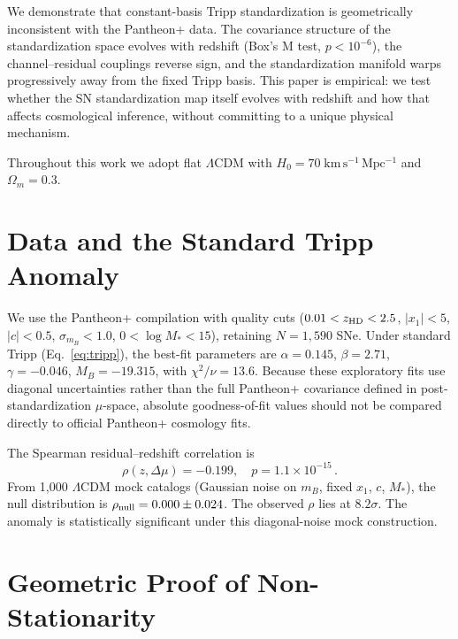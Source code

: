 \documentclass[twocolumn,showpacs,preprintnumbers,amsmath,amssymb,prl]{revtex4-2}
\begin{document}
We demonstrate that constant-basis Tripp standardization is geometrically inconsistent with the Pantheon+ data. The covariance structure of the standardization space evolves with redshift (Box's M test, $p < 10^{-6}$), the channel--residual couplings reverse sign, and the standardization manifold warps progressively away from the fixed Tripp basis. This paper is empirical: we test whether the SN standardization map itself evolves with redshift and how that affects cosmological inference, without committing to a unique physical mechanism.

Throughout this work we adopt flat $\Lambda$CDM with $H_0 = 70\;\mathrm{km\,s^{-1}\,Mpc^{-1}}$ and $\Omega_m = 0.3$.

\section{Data and the Standard Tripp Anomaly}
\label{sec:data}

We use the Pantheon+ compilation \citep{Scolnic2022} with quality cuts ($0.01 < z_{\rm HD} < 2.5$, $|x_1| < 5$, $|c| < 0.5$, $\sigma_{m_B} < 1.0$, $0 < \log M_* < 15$), retaining $N = 1{,}590$ SNe. Under standard Tripp (Eq.~\ref{eq:tripp}), the best-fit parameters are $\alpha = 0.145$, $\beta = 2.71$, $\gamma = -0.046$, $M_B = -19.315$, with $\chi^2/\nu = 13.6$. Because these exploratory fits use diagonal uncertainties rather than the full Pantheon+ covariance defined in post-standardization $\mu$-space, absolute goodness-of-fit values should not be compared directly to official Pantheon+ cosmology fits.

The Spearman residual--redshift correlation is
\begin{equation}
\rho(z, \Delta\mu) = -0.199, \quad p = 1.1 \times 10^{-15}\,.
\end{equation}
From 1{,}000 $\Lambda$CDM mock catalogs (Gaussian noise on $m_B$, fixed $x_1$, $c$, $M_*$), the null distribution is $\rho_{\rm null} = 0.000 \pm 0.024$. The observed $\rho$ lies at $8.2\sigma$. The anomaly is statistically significant under this diagonal-noise mock construction.

\section{Geometric Proof of Non-Stationarity}
\label{sec:geometry}
\end{document}
